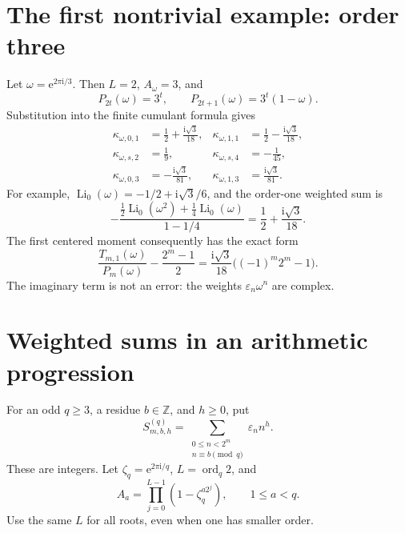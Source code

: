 \documentclass[11pt,a4paper,oneside,openany]{book}
\numberwithin{equation}{chapter}
\theoremstyle{definition}
\theoremstyle{remark}
\newcommand{\eps}{\varepsilon}
\newcommand{\Z}{\mathbb Z}
\newcommand{\e}{\mathrm e}
\newcommand{\ii}{\mathrm i}
\DeclareMathOperator{\ord}{ord}
\DeclareMathOperator{\Li}{Li}
\begin{document}
\section{The first nontrivial example: order three}
Let \(\omega=\e^{2\pi\ii/3}\). Then \(L=2\), \(A_\omega=3\), and
\begin{equation}
 P_{2t}(\omega)=3^t,\qquad P_{2t+1}(\omega)=3^t(1-\omega).
 \label{rr:eq:omegaP}
\end{equation}
Substitution into the finite cumulant formula gives
\begin{align}
 \kappa_{\omega,0,1}&=\frac12+\frac{\ii\sqrt3}{18},&
 \kappa_{\omega,1,1}&=\frac12-\frac{\ii\sqrt3}{18},\\
 \kappa_{\omega,s,2}&=\frac19,&
 \kappa_{\omega,s,4}&=-\frac1{45},\\
 \kappa_{\omega,0,3}&=-\frac{\ii\sqrt3}{81},&
 \kappa_{\omega,1,3}&=\frac{\ii\sqrt3}{81}.
 \label{rr:eq:omegakappa}
\end{align}
For example, \(\Li_0(\omega)=-1/2+\ii\sqrt3/6\), and the order-one weighted sum is
\[
 -\frac{\frac12\Li_0(\omega^2)+\frac14\Li_0(\omega)}{1-1/4}
 =\frac12+\frac{\ii\sqrt3}{18}.
\]
The first centered moment consequently has the exact form
\begin{equation}
 \frac{T_{m,1}(\omega)}{P_m(\omega)}-\frac{2^m-1}{2}
 =\frac{\ii\sqrt3}{18}\bigl((-1)^m2^m-1\bigr).
 \label{rr:eq:omegacenter}
\end{equation}
The imaginary term is not an error: the weights \(\eps_n\omega^n\) are complex.

\section{Weighted sums in an arithmetic progression}
For an odd \(q\geq3\), a residue \(b\in\Z\), and \(h\geq0\), put
\begin{equation}
 S^{(q)}_{m,b,h}=\sum_{\substack{0\leq n<2^m\\n\equiv b\pmod q}}
                  \eps_n n^h.
 \label{rr:eq:progression}
\end{equation}
These are integers. Let \(\zeta_q=\e^{2\pi\ii/q}\), \(L=\ord_q2\), and
\[
 A_a=\prod_{j=0}^{L-1}(1-\zeta_q^{a2^j}),\qquad 1\leq a<q.
\]
Use the same \(L\) for all roots, even when one has smaller order.
\end{document}
